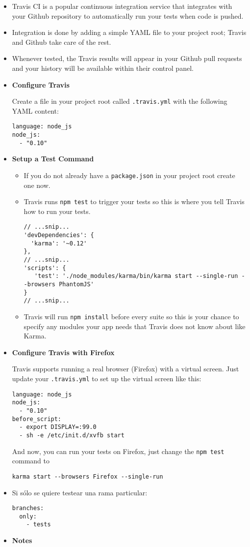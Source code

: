 \begin{itemize}
\item
Travis CI is a popular continuous integration service that integrates
with your Github repository to automatically run your tests when code
is pushed. 

\item
Integration is done by adding a simple YAML file to your
project root; Travis and Github take care of the rest. 

\item
Whenever tested,
the Travis results will appear in your Github pull requests and your
history will be available within their control panel. 

\item
{\bf Configure Travis}

Create a file in your project root called \verb|.travis.yml| with the following YAML content:
\begin{verbatim}
language: node_js
node_js:
  - "0.10"
\end{verbatim}
\item
{\bf Setup a Test Command}

\begin{itemize}
\item
If you do not already have a \verb|package.json| in your project root create one now. 

\item
Travis runs \verb|npm test| to trigger your tests so this is where you tell Travis how to run your tests.
\begin{verbatim}
// ...snip...
'devDependencies': {
  'karma': '~0.12'
},
// ...snip...
'scripts': {
   'test': './node_modules/karma/bin/karma start --single-run --browsers PhantomJS'
}
// ...snip...
\end{verbatim}
\item
Travis will run \verb|npm install| before every suite so this is your
chance to specify any modules your app needs that Travis does not know
about like Karma.
\end{itemize}
\item
{\bf Configure Travis with Firefox}

Travis supports running a real browser (Firefox) with a virtual screen. Just update your \verb|.travis.yml| to set up the virtual screen like this:
\begin{verbatim}
language: node_js
node_js:
  - "0.10"
before_script:
  - export DISPLAY=:99.0
  - sh -e /etc/init.d/xvfb start
\end{verbatim}
And now, you can run your tests on Firefox, just change the \verb|npm test| command to
\begin{verbatim}
karma start --browsers Firefox --single-run
\end{verbatim}
\item Si sólo se quiere testear una rama particular:
\begin{verbatim}
branches:
  only:
    - tests
\end{verbatim}
\item
{\bf Notes}


\end{itemize}
